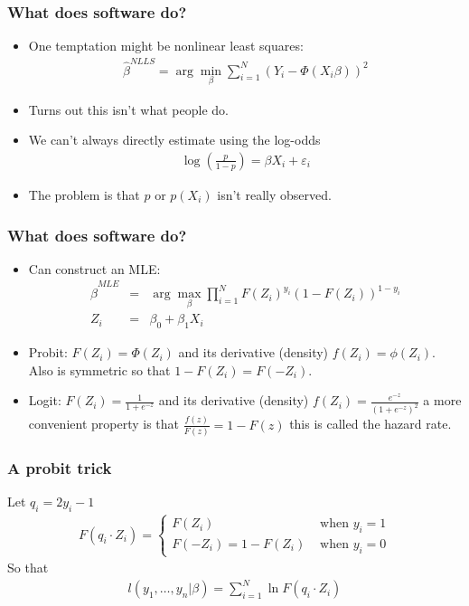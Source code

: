 \documentclass[aspectratio=169]{beamer}
\begin{document}
\begin{frame}
\frametitle{What does software do?}
\begin{itemize}
\item One temptation might be \alert{nonlinear least squares}:
\begin{eqnarray*}
\hat{\beta}^{NLLS} = \arg \min_{\beta} \sum_{i=1}^N (Y_i - \Phi(X_i \beta))^2
\end{eqnarray*}
\item Turns out this isn't what people do.
\item We can't always directly estimate using the log-odds
\begin{eqnarray*}
\log\left(\frac{p}{1-p}\right)= \beta X_i + \varepsilon_i
\end{eqnarray*}
\item The problem is that $p$ or $p(X_i)$ isn't really observed.
\end{itemize}
\end{frame}

\begin{frame}
\frametitle{What does software do?}
\begin{itemize}
\item Can construct an MLE:
\begin{eqnarray*}
\hat{\beta}^{MLE} &=& \arg \max_{\beta} \prod_{i=1}^N F(Z_i)^{y_i} (1-F(Z_i))^{1-{y_i} }\\
Z_i &=& \beta_0 + \beta_1 X_i
\end{eqnarray*}
\item Probit: $F(Z_i) = \Phi(Z_i)$ and its derivative (density) $f(Z_i) = \phi(Z_i)$. \\
Also is \alert{symmetric} so that $1 - F(Z_i) = F(-Z_i)$.
\item Logit: $F(Z_i) = \frac{1}{1+e^{-z}}$ and its derivative (density) $f(Z_i) = \frac{e^{-z}}{(1+e^{-z})^2}$ a more convenient property is that $\frac{f(z)}{F(z)} = 1 - F(z)$ this is called the \alert{hazard rate}.
\end{itemize}
\end{frame}

\begin{frame}
\frametitle{A probit trick}
Let $q_i = 2 y_i -1$
\begin{eqnarray*}
F(q_i \cdot Z_i) = 
\begin{cases}
F(Z_i)  &\mbox{ when } y_i=1 \\
F(-Z_i) = 1-F(Z_i)& \mbox{ when } y_i=0
\end{cases}
\end{eqnarray*}
So that 
\begin{eqnarray*}
l(y_1,\ldots, y_n | \beta) = \sum_{i=1}^N \ln F(q_i \cdot Z_i) 
\end{eqnarray*}
\end{frame}
\end{document}
